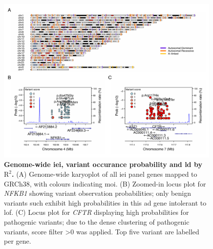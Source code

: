 \begin{figure}[ht]
  \centering
  \includegraphics[width=0.99\textwidth]{../images/karyo_locusplot_merged.pdf}
  \caption{\textbf{Genome-wide \ac{iei}, variant occurance probability and \ac{ld} by $\text{R}^2$.} (A) Genome-wide karyoplot of all \ac{iei} panel genes mapped to GRCh38, with colours indicating \ac{moi}. (B) Zoomed-in locus plot for \textit{NFKB1} showing variant observation probabilities; only benign variants such exhibit high probabilities in this \ac{ad} gene intolerant to \ac{lof}. (C) Locus plot for \textit{CFTR} displaying high probabilities for pathogenic variants; due to the dense clustering of pathogenic variants, score filter >0 was applied. Top five variant are labelled per gene.}
  \label{fig:karyo_locusplot_merged}
\end{figure}

